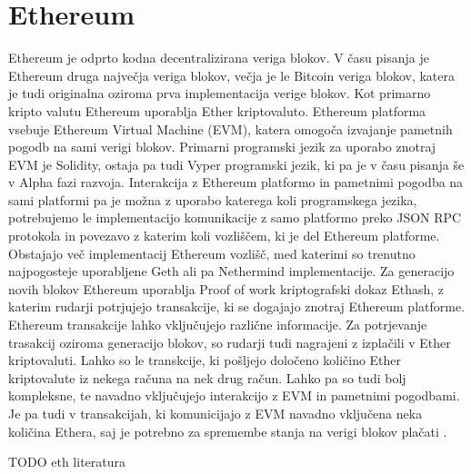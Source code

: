 \documentclass[a4paper,12pt,openright]{book}
\begin{document}
\section{Ethereum}
Ethereum je odprto kodna decentralizirana veriga blokov.
V času pisanja je Ethereum druga največja veriga blokov, večja je le Bitcoin veriga blokov, katera je tudi originalna oziroma prva implementacija verige blokov.
Kot primarno kripto valutu Ethereum uporablja Ether kriptovaluto.
Ethereum platforma vsebuje Ethereum Virtual Machine (EVM), katera omogoča izvajanje pametnih pogodb na sami verigi blokov.
Primarni programski jezik za uporabo znotraj EVM je Solidity, ostaja pa tudi Vyper programski jezik, ki pa je v času pisanja še v Alpha fazi razvoja.
Interakcija z Ethereum platformo in pametnimi pogodba na sami platformi pa je možna z uporabo katerega koli programskega jezika, potrebujemo le implementacijo komunikacije z samo platformo preko JSON RPC protokola in povezavo z katerim koli vozliščem, ki je del Ethereum platforme.
Obstajajo več implementacij Ethereum vozlišč, med katerimi so trenutno najpogosteje uporabljene Geth ali pa Nethermind implementacije.
Za generacijo novih blokov Ethereum uporablja Proof of work kriptografski dokaz Ethash, z katerim rudarji potrjujejo transakcije, ki se dogajajo znotraj Ethereum platforme. 
Ethereum transakcije lahko vključujejo različne informacije. 
Za potrjevanje trasakcij oziroma generacijo blokov, so rudarji tudi nagrajeni z izplačili v Ether kriptovaluti.
Lahko so le transkcije, ki pošljejo določeno količino Ether kriptovalute iz nekega računa na nek drug račun.
Lahko pa so tudi bolj kompleksne, te navadno vključujejo interakcijo z EVM in pametnimi pogodbami.
Je pa tudi v transakcijah, ki komunicijajo z EVM navadno vključena neka količina Ethera, saj je potrebno za spremembe stanja na verigi blokov plačati \cite{ethereum_whitepaper}.

TODO eth literatura
\end{document}
